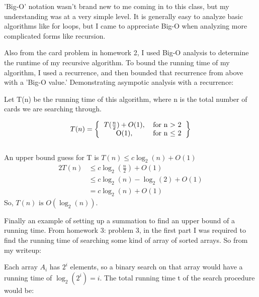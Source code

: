 \documentclass[a4paper,12pt]{article}
\newenvironment{indentpar}[1]%
{\begin{list}{}%
    {\setlength{\leftmargin}{#1}}%
  \item[]%
  }
  {\end{list}}
\begin{document}
\begin{enumerate}[]

\item 'Big-O' notation wasn't brand new to me coming in to this class,
  but my understanding was at a very simple level. It is generally
  easy to analyze basic algorithms like for loops, but I came to
  appreciate Big-O when analyzing more complicated forms like
  recursion.

\item Also from the card problem in homework 2, I used Big-O analysis
  to determine the runtime of my recursive algorithm. To bound the
  running time of my algorithm, I used a recurrence, and then bounded
  that recurrence from above with a 'Big-O value.' Demonstrating
  asympotic analysis with a recurrence:

  \begin{indentpar}{0.5in}

    Let T(n) be the running time of this algorithm, where n is the total
    number of cards we are searching through.

    \[T(n) = \left\{
      \begin{tabular}{c c}
        \(T(\frac{n}{2}) + O(1)\),& for n \(>\) 2 \\
        O(1),& for n \(\le\) 2\\
      \end{tabular}
    \right\}\]\\

    An upper bound guess for T is \(T(n) \le c\log_2 (n) + O(1) \)
    \begin{alignat*}{2}
      T(n)& \le c\log_2 (\frac{n}{2}) + O(1) \\
      {}& \le c\log_2 (n) - \log_2 (2) + O(1)\\
      {}& = c\log_2(n) + O(1)
    \end{alignat*}
    So, \(T(n) \text{ is } O(\log_2 (n))\).

  \end{indentpar}

\item Finally an example of setting up a summation to find an upper
  bound of a running time. From homework 3: problem 3, in the first
  part I was required to find the running time of searching some kind
  of array of sorted arrays. So from my writeup:

  \begin{indentpar}{0.5in}
    Each array \(A_i\) has \(2^i\) elements, so a binary search on
    that array would have a running time of \(\log_2(2^i) = i \). The
    total running time t of the search procedure would be:
    

\end{indentpar}
\end{enumerate}
\end{document}
